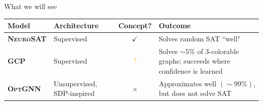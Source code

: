 \documentclass[aspectratio=169,10pt,dvipsnames]{beamer}
\newcommand{\NeuroSAT}{{\rmfamily\textsc{NeuroSAT}}}
\newcommand{\OptGNN}{{\rmfamily\textsc{OptGNN}}}
\newcommand{\GCP}{{\rmfamily\textsc{GCP}}}
\begin{document}
\begin{frame}{What we will see}

\centering
\renewcommand{\arraystretch}{1.55}
\small

\begin{tabular}{@{}p{2.1cm}p{2.8cm}c p{5.0cm}@{}}
\toprule
\textbf{Model} & \textbf{Architecture} & \textbf{Concept?} & \textbf{Outcome} \\
\midrule

\textbf{\NeuroSAT}
&
Supervised
&
\textcolor{green!55!black}{\Large\(\checkmark\)}
&
Solves random SAT ``well"
\\

\midrule

\textbf{\GCP}
&
Supervised
&
\textcolor{orange}{\Large\(\boldsymbol{?}\)}
&
Solves \(\sim 5\%\) of 3-colorable graphs; succeeds where confidence is learned
\\

\midrule

\textbf{\OptGNN}
&
Unsupervised, SDP-inspired
&
\textcolor{red!75!black}{\Large\(\times\)}
&
Approximates well \((\sim 99\%)\), but does not  solve SAT
\\

\bottomrule
\end{tabular}

\medskip


\end{frame}
\end{document}
